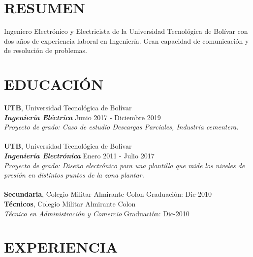 \documentclass[margin]{res}
\begin{document}
\begin{resume}

\section{RESUMEN}
Ingeniero Electrónico y Electricista de la Universidad Tecnológica de Bolívar con dos años de experiencia laboral en Ingeniería. Gran capacidad de comunicación y de resolución de problemas.

\section{EDUCACIÓN}
\textbf{UTB}, Universidad Tecnológica de Bolívar\\
{\sl \textbf{Ingeniería Eléctrica}} \hfill Junio 2017 - Diciembre 2019
\\
{\sl Proyecto de grado: Caso de estudio Descargas Parciales, Industria cementera.}
\\\\
\textbf{UTB}, Universidad Tecnológica de Bolívar\\
{\sl \textbf{Ingeniería Electrónica}} \hfill Enero 2011 - Julio 2017
\\
{\sl Proyecto de grado: Diseño electrónico para una plantilla que mide los niveles de presión en distintos puntos de la zona plantar.}
\\\\
\textbf{Secundaria}, Colegio Militar Almirante Colon \hfill Graduación: Dic-2010
\\
\textbf{Técnicos}, Colegio Militar Almirante Colon\\
{\sl Técnico en Administración y Comercio} \hfill Graduación: Dic-2010


\section{EXPERIENCIA}


\end{resume}
\end{document}
